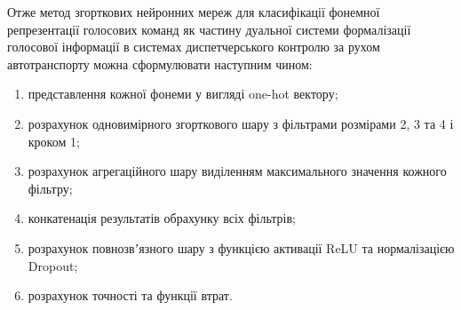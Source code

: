 %
%
%
%
%
%
%
%
%


Отже метод згорткових нейронних мереж для класифікації фонемної репрезентації голосових команд як частину дуальної системи формалізації голосової інформації в системах диспетчерського контролю за рухом автотранспорту можна сформулювати наступним чином:

\begin{enumerate}
	\item представлення кожної фонеми у вигляді one-hot вектору;
	\item розрахунок одновимірного згорткового шару з фільтрами розмірами 2, 3 та 4 і кроком 1;
	\item розрахунок агрегаційного шару виділенням максимального значення кожного фільтру;
	\item конкатенація результатів обрахунку всіх фільтрів;
	\item розрахунок повнозвʼязного шару з функцією активації ReLU та нормалізацією Dropout;
	\item розрахунок точності та функції втрат.
\end{enumerate}

